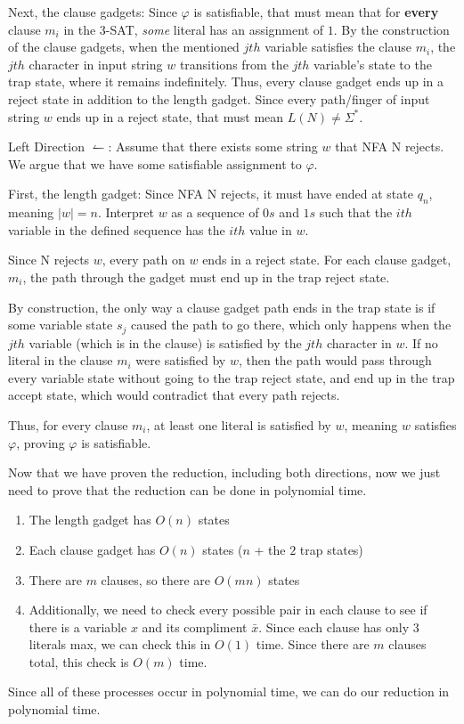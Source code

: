 \documentclass[12pt]{article}
\begin{document}
\begin{solution}
    Next, the clause gadgets: Since $\varphi$ is satisfiable, that must mean that for \textbf{every} clause $m_i$ in the 3-SAT, \textit{some} literal has an assignment of $1$. By the construction of the clause gadgets, when the mentioned $jth$ variable satisfies the clause $m_i$, the $jth$ character in input string $w$ transitions from the $jth$ variable's state to the trap state, where it remains indefinitely. Thus, every clause gadget ends up in a reject state in addition to the length gadget. Since every path/finger of input string $w$ ends up in a reject state, that must mean $L(N) \ne \Sigma^*$.
    
    Left Direction $\leftharpoonup$:
    Assume that there exists some string $w$ that NFA N rejects. We argue that we have some satisfiable assignment to $\varphi$. 
    
    First, the length gadget: Since NFA N rejects, it must have ended at state $q_n$, meaning $|w| = n$. Interpret $w$ as a sequence of $0s$ and $1s$ such that the $ith$ variable in the defined sequence has the $ith$ value in $w$.
    
    Since N rejects $w$, every path on $w$ ends in a reject state. For each clause gadget, $m_i$, the path through the gadget must end up in the trap reject state.
    
    By construction, the only way a clause gadget path ends in the trap state is if some variable state $s_j$ caused the path to go there, which only happens when the $jth$ variable (which is in the clause) is satisfied by the $jth$ character in $w$. If no literal in the clause $m_i$ were satisfied by $w$, then the path would pass through every variable state without going to the trap reject state, and end up in the trap accept state, which would contradict that every path rejects.
    
    Thus, for every clause $m_i$, at least one literal is satisfied by $w$, meaning $w$ satisfies $\varphi$, proving $\varphi$ is satisfiable.


    Now that we have proven the reduction, including both directions, now we just need to prove that the reduction can be done in polynomial time.

    \begin{enumerate}
    \item The length gadget has $O(n)$ states
    \item Each clause gadget has $O(n)$ states ($n$ + the $2$ trap states)
    \item There are $m$ clauses, so there are $O(mn)$ states
    \item Additionally, we need to check every possible pair in each clause to see if there is a variable $x$ and its compliment $\bar{x}$. Since each clause has only 3 literals max, we can check this in $O(1)$ time. Since there are $m$ clauses total, this check is $O(m)$ time.
    \end{enumerate}

    Since all of these processes occur in polynomial time, we can do our reduction in polynomial time. 

\end{solution}
\end{document}
